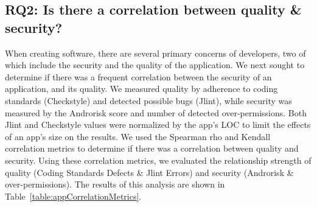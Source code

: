 \documentclass{sig-alternate-05-2015}
\newcommand{\dan}[1]{\textcolor{blue}{{\it [Dan says: #1]}}}
\begin{document}
%
%
%


\subsection{RQ2: Is there a correlation between quality \& security?}

When creating software, there are several primary concerns of developers, two of which include the security and the quality of the application. We next sought to determine if there was a frequent correlation between the security of an application, and its quality. We measured quality by adherence to coding standards (Checkstyle) and detected possible bugs (Jlint), while security was measured by the Androrisk score and number of detected over-permissions. Both Jlint and Checkstyle values were normalized by the app's LOC to limit the effects of an app's size on the results. We used the Spearman rho and Kendall correlation metrics to determine if there was a correlation between quality and security. Using these correlation metrics, we evaluated the relationship strength of quality (Coding Standards Defects \& Jlint Errors) and security (Androrisk \& over-permissions). The results of this analysis are shown in Table~\ref{table:appCorrelationMetrics}.
\end{document}
